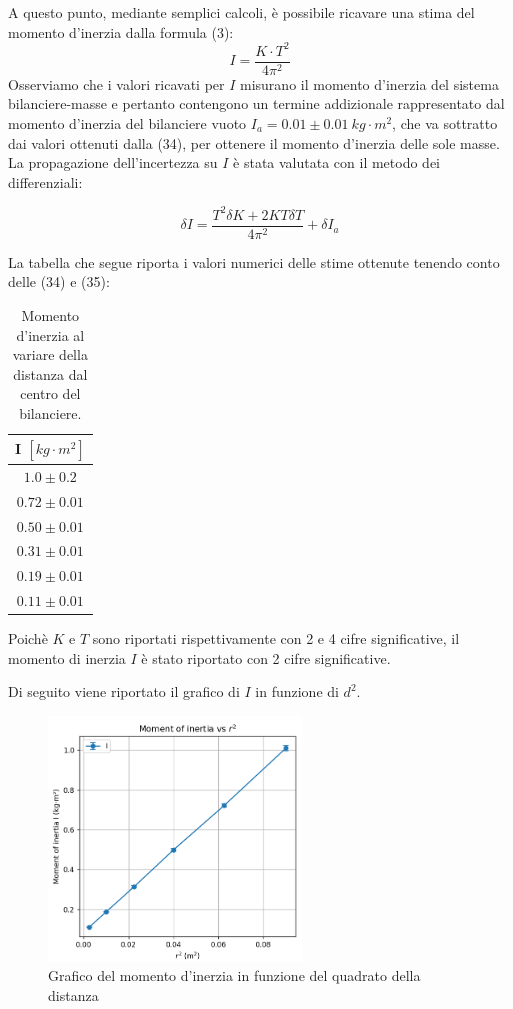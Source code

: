 A questo punto, mediante semplici calcoli, è possibile ricavare una stima del momento d'inerzia dalla formula (3):
\begin{equation}
    I = \frac{K \cdot T^2}{4\pi^2}
\end{equation} 
Osserviamo che i valori ricavati per $I$ misurano il momento d'inerzia del sistema bilanciere-masse e pertanto contengono un termine addizionale rappresentato dal momento d'inerzia del bilanciere vuoto $I_a = 0.01 \pm 0.01 \ kg \cdot m^2$, che va sottratto dai valori ottenuti dalla (34), per ottenere il momento d'inerzia delle sole masse. La propagazione dell'incertezza su $I$ è stata valutata con il metodo dei differenziali:

\begin{equation}
    \delta I = \frac{T^2 \delta K + 2 KT \delta T}{4\pi^2} + \delta I_a
\end{equation}

La tabella che segue riporta i valori numerici delle stime ottenute tenendo conto delle (34) e (35):

\begin{table}[H]
	\centering
	\begin{tabular}{|c|}
		\hline
		\textbf{I $[kg \cdot m^2]$} \\
		\hline
		$1.0\pm 0.2$ \\
		$0.72\pm 0.01$ \\
		$0.50\pm 0.01$ \\
		$0.31\pm 0.01$ \\
		$0.19\pm 0.01$ \\
            $0.11 \pm 0.01$ \\
		\hline
	\end{tabular}
	\caption{Momento d'inerzia al variare della distanza dal centro del bilanciere.}
	\label{tab:}
\end{table}

Poichè $K$ e $T$ sono riportati rispettivamente con 2 e 4 cifre significative, il momento di inerzia $I$ è stato riportato con 2 cifre significative.

Di seguito viene riportato il grafico di $I$ in funzione di $d^2$.

\begin{figure}[h]
    \centering
    \includegraphics[width=0.6\textwidth]{figures/graph_1.png}
    \caption{Grafico del momento d'inerzia in funzione del quadrato della distanza}
    \label{fig:etichetta}
\end{figure}

